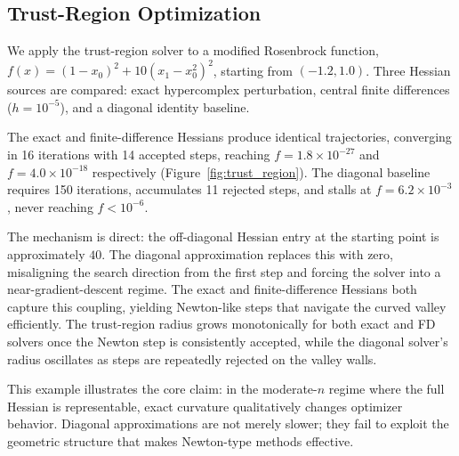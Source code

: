 \subsection{Trust-Region Optimization}

We apply the trust-region solver to a modified Rosenbrock function,
$f(x) = (1 - x_0)^2 + 10(x_1 - x_0^2)^2$, starting from $(-1.2, 1.0)$.
Three Hessian sources are compared: exact hypercomplex perturbation,
central finite differences ($h = 10^{-5}$), and a diagonal identity baseline.

The exact and finite-difference Hessians produce identical trajectories,
converging in 16 iterations with 14 accepted steps, reaching
$f = 1.8 \times 10^{-27}$ and $f = 4.0 \times 10^{-18}$ respectively
(Figure~\ref{fig:trust_region}). The diagonal baseline requires 150 iterations,
accumulates 11 rejected steps, and stalls at $f = 6.2 \times 10^{-3}$,
never reaching $f < 10^{-6}$.

The mechanism is direct: the off-diagonal Hessian entry at the starting point
is approximately $40$. The diagonal approximation replaces this with zero,
misaligning the search direction from the first step and forcing the solver
into a near-gradient-descent regime. The exact and finite-difference Hessians
both capture this coupling, yielding Newton-like steps that navigate the curved
valley efficiently. The trust-region radius grows monotonically for both
exact and FD solvers once the Newton step is consistently accepted, while
the diagonal solver's radius oscillates as steps are repeatedly rejected on
the valley walls.

This example illustrates the core claim: in the moderate-$n$ regime where the
full Hessian is representable, exact curvature qualitatively changes optimizer
behavior. Diagonal approximations are not merely slower; they fail to exploit
the geometric structure that makes Newton-type methods effective.



